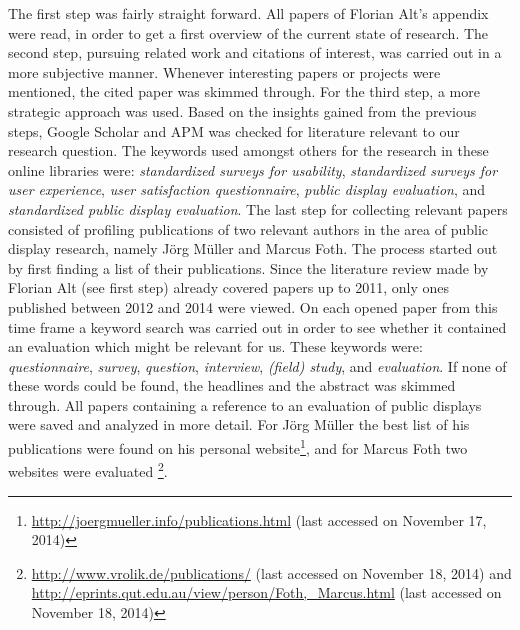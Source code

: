 	The first step was fairly straight forward. All papers of Florian Alt's appendix were read, in order to get a first overview of the current state of research. 
	The second step, pursuing related work and citations of interest, was carried out in a more subjective manner. Whenever interesting papers or projects were mentioned, the cited paper was skimmed through. 
	For the third step, a more strategic approach was used. Based on the insights gained from the previous steps, Google Scholar and APM was checked for literature relevant to our research question. The keywords used amongst others for the research in these online libraries were: \textit{standardized surveys for usability}, \textit{standardized surveys for user experience}, \textit{user satisfaction questionnaire}, \textit{public display evaluation}, and \textit{standardized public display evaluation}.
	The last step for collecting relevant papers consisted of profiling publications of two relevant authors in the area of public display research, namely J\"org M\"uller and Marcus Foth. The process started out by first finding a list of their publications. Since the literature review made by Florian Alt (see first step) already covered papers up to 2011, only ones published between 2012 and 2014 were viewed. 
	On each opened paper from this time frame a keyword search was carried out in order to see whether it contained an evaluation which might be relevant for us. These keywords were: \textit{questionnaire}, \textit{survey}, \textit{question}, \textit{interview}, \textit{(field) study}, and \textit{evaluation}. If none of these words could be found, the headlines and the abstract was skimmed through. All papers containing a reference to an evaluation of public displays were saved and analyzed in more detail.
	For J\"org M\"uller the best list of his publications were found on his personal website\footnote{\url{http://joergmueller.info/publications.html} (last accessed on November 17, 2014)}, and for Marcus Foth two websites were evaluated \footnote{\url{http://www.vrolik.de/publications/} (last accessed on November 18, 2014) and \url{http://eprints.qut.edu.au/view/person/Foth,_Marcus.html} (last accessed on November 18, 2014)}. 





\clearpage

